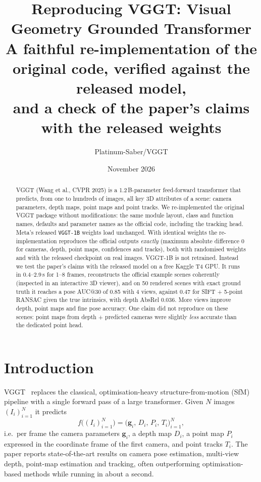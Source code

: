 \documentclass[11pt,a4paper]{article}
\title{\textbf{Reproducing VGGT: Visual Geometry Grounded Transformer}\\[4pt]
\large A faithful re-implementation of the original code, verified against the released model,\\
and a check of the paper's claims with the released weights}
\author{Platinum-Saber/VGGT}
\date{November 2026}
\begin{document}
\maketitle

\begin{abstract}
VGGT (Wang et al., CVPR 2025) is a 1.2\,B-parameter feed-forward transformer that predicts, from one to hundreds of
images, all key 3D attributes of a scene: camera parameters, depth maps, point maps and point tracks.
We re-implemented the original VGGT package without modifications: the same module layout, class and function names,
defaults and parameter names as the official code, including the tracking head. Meta's released \texttt{VGGT-1B} weights
load unchanged. With identical weights the re-implementation reproduces the official outputs \emph{exactly} (maximum
absolute difference $0$ for cameras, depth, point maps, confidences and tracks), both with randomised weights and with the
released checkpoint on real images. VGGT-1B is not retrained. Instead we test the paper's claims with the released model
on a free Kaggle T4 GPU. It runs in 0.4--2.9\,s for 1--8 frames, reconstructs the official example scenes coherently
(inspected in an interactive 3D viewer), and on 50 rendered scenes with exact ground truth it reaches a pose AUC@30 of 0.85
with 4 views, against 0.47 for SIFT + 5-point RANSAC given the true intrinsics, with depth AbsRel 0.036. More views improve
depth, point maps and fine pose accuracy. One claim did not reproduce on these scenes: point maps from depth + predicted cameras
were slightly \emph{less} accurate than the dedicated point head.
\end{abstract}

\tableofcontents
\newpage

\section{Introduction}

VGGT~\cite{vggt} replaces the classical, optimisation-heavy structure-from-motion (SfM) pipeline with a single forward
pass of a large transformer. Given $N$ images $(I_i)_{i=1}^N$ it predicts
\begin{equation}
  f\big((I_i)_{i=1}^{N}\big) = \big(\mathbf{g}_i,\, D_i,\, P_i,\, T_i\big)_{i=1}^{N},
\end{equation}
i.e.\ per frame the camera parameters $\mathbf{g}_i$, a depth map $D_i$, a point map $P_i$ expressed in the coordinate frame
of the first camera, and point tracks $T_i$. The paper reports state-of-the-art results on camera pose estimation, multi-view
depth, point-map estimation and tracking, often outperforming optimisation-based methods while running in about a second.
\end{document}
